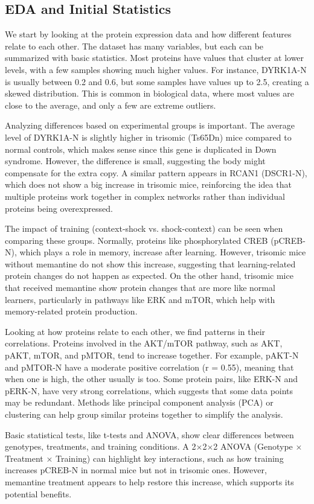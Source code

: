 \documentclass[a4paper,12pt]{article}
\begin{document}
\subsection{EDA and Initial Statistics}
We start by looking at the protein expression data and how different features relate to each other. The dataset has many variables, but each can be summarized with basic statistics. Most proteins have values that cluster at lower levels, with a few samples showing much higher values. For instance, DYRK1A-N is usually between 0.2 and 0.6, but some samples have values up to 2.5, creating a skewed distribution. This is common in biological data, where most values are close to the average, and only a few are extreme outliers.

Analyzing differences based on experimental groups is important. The average level of DYRK1A-N is slightly higher in trisomic (Ts65Dn) mice compared to normal controls, which makes sense since this gene is duplicated in Down syndrome. However, the difference is small, suggesting the body might compensate for the extra copy. A similar pattern appears in RCAN1 (DSCR1-N), which does not show a big increase in trisomic mice, reinforcing the idea that multiple proteins work together in complex networks rather than individual proteins being overexpressed.

The impact of training (context-shock vs. shock-context) can be seen when comparing these groups. Normally, proteins like phosphorylated CREB (pCREB-N), which plays a role in memory, increase after learning. However, trisomic mice without memantine do not show this increase, suggesting that learning-related protein changes do not happen as expected. On the other hand, trisomic mice that received memantine show protein changes that are more like normal learners, particularly in pathways like ERK and mTOR, which help with memory-related protein production.

Looking at how proteins relate to each other, we find patterns in their correlations. Proteins involved in the AKT/mTOR pathway, such as AKT, pAKT, mTOR, and pMTOR, tend to increase together. For example, pAKT-N and pMTOR-N have a moderate positive correlation (r = 0.55), meaning that when one is high, the other usually is too. Some protein pairs, like ERK-N and pERK-N, have very strong correlations, which suggests that some data points may be redundant. Methods like principal component analysis (PCA) or clustering can help group similar proteins together to simplify the analysis.

Basic statistical tests, like t-tests and ANOVA, show clear differences between genotypes, treatments, and training conditions. A 2×2×2 ANOVA (Genotype × Treatment × Training) can highlight key interactions, such as how training increases pCREB-N in normal mice but not in trisomic ones. However, memantine treatment appears to help restore this increase, which supports its potential benefits.
\end{document}
